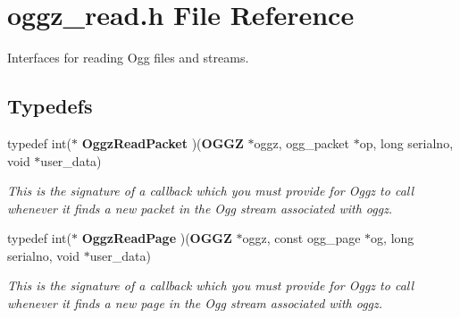 \section{oggz\-\_\-read.\-h \-File \-Reference}
\label{oggz__read_8h}


\-Interfaces for reading \-Ogg files and streams.  


\subsection*{\-Typedefs}
\begin{DoxyCompactItemize}
\item 
typedef int($\ast$ {\bf \-Oggz\-Read\-Packet} )({\bf \-O\-G\-G\-Z} $\ast$oggz, ogg\-\_\-packet $\ast$op, long serialno, void $\ast$user\-\_\-data)
\begin{DoxyCompactList}\small\item\em \-This is the signature of a callback which you must provide for \-Oggz to call whenever it finds a new packet in the \-Ogg stream associated with {\itshape oggz\/}. \end{DoxyCompactList}\item 
typedef int($\ast$ {\bf \-Oggz\-Read\-Page} )({\bf \-O\-G\-G\-Z} $\ast$oggz, const ogg\-\_\-page $\ast$og, long serialno, void $\ast$user\-\_\-data)
\begin{DoxyCompactList}\small\item\em \-This is the signature of a callback which you must provide for \-Oggz to call whenever it finds a new page in the \-Ogg stream associated with {\itshape oggz\/}. \end{DoxyCompactList}\end{DoxyCompactItemize}
